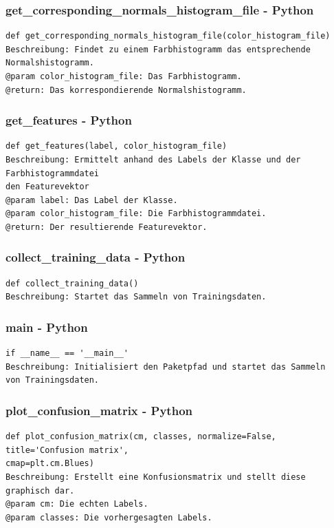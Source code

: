 \documentclass{suturo}
\begin{document}
\subsubsection{get\_corresponding\_normals\_histogram\_file - Python}
\begin{verbatim}
def get_corresponding_normals_histogram_file(color_histogram_file)
Beschreibung: Findet zu einem Farbhistogramm das entsprechende Normalshistogramm. 
@param color_histogram_file: Das Farbhistogramm.
@return: Das korrespondierende Normalshistogramm.
\end{verbatim}

\subsubsection{get\_features - Python}
\begin{verbatim}
def get_features(label, color_histogram_file)
Beschreibung: Ermittelt anhand des Labels der Klasse und der Farbhistogrammdatei 
den Featurevektor
@param label: Das Label der Klasse.
@param color_histogram_file: Die Farbhistogrammdatei.
@return: Der resultierende Featurevektor.
\end{verbatim}

\subsubsection{collect\_training\_data - Python}
\begin{verbatim}
def collect_training_data()
Beschreibung: Startet das Sammeln von Trainingsdaten.
\end{verbatim}

\subsubsection{main - Python}
\begin{verbatim}
if __name__ == '__main__'
Beschreibung: Initialisiert den Paketpfad und startet das Sammeln 
von Trainingsdaten.
\end{verbatim}

\subsubsection{plot\_confusion\_matrix - Python}
\begin{verbatim}
def plot_confusion_matrix(cm, classes, normalize=False, title='Confusion matrix',
cmap=plt.cm.Blues)
Beschreibung: Erstellt eine Konfusionsmatrix und stellt diese graphisch dar. 
@param cm: Die echten Labels.
@param classes: Die vorhergesagten Labels.
\end{verbatim}
\end{document}
